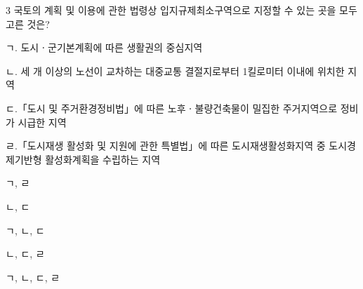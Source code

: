 \begin{question}{3}
국토의 계획 및 이용에 관한 법령상 입지규제최소구역으로 지정할 수 있는 곳을 모두 고른 것은?
\begin{framedtext}
ㄱ. 도시ㆍ군기본계획에 따른 생활권의 중심지역 \par
ㄴ. 세 개 이상의 노선이 교차하는 대중교통 결절지로부터 1킬로미터 이내에 위치한 지역 \par
ㄷ.「도시 및 주거환경정비법」에 따른 노후ㆍ불량건축물이 밀집한 주거지역으로 정비가 시급한 지역 \par
ㄹ.「도시재생 활성화 및 지원에 관한 특별법」에 따른 도시재생활성화지역 중 도시경제기반형 활성화계획을 수립하는 지역 \par
\end{framedtext}
\begin{choices}
  \item ㄱ, ㄹ
  \item ㄴ, ㄷ
  \item ㄱ, ㄴ, ㄷ
  \item ㄴ, ㄷ, ㄹ
  \item ㄱ, ㄴ, ㄷ, ㄹ
\end{choices}
\end{question}
